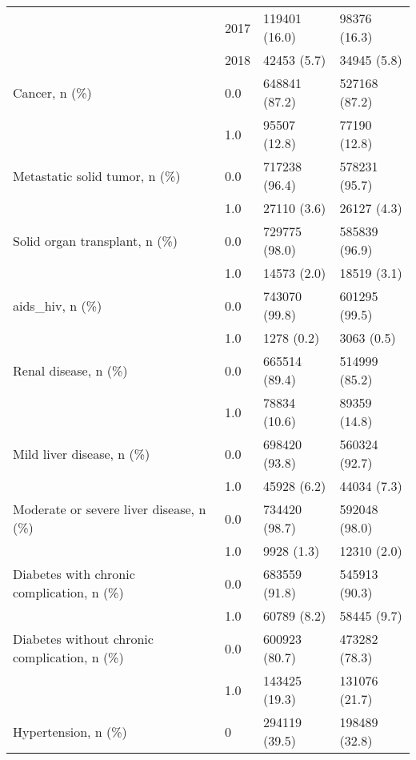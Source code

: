 \begin{tabular}{llll}
                                       & 2017 &      119401 (16.0) &       98376 (16.3) \\
                                       & 2018 &        42453 (5.7) &        34945 (5.8) \\
Cancer, n (\%) & 0.0 &      648841 (87.2) &      527168 (87.2) \\
                                       & 1.0 &       95507 (12.8) &       77190 (12.8) \\
Metastatic solid tumor, n (\%) & 0.0 &      717238 (96.4) &      578231 (95.7) \\
                                       & 1.0 &        27110 (3.6) &        26127 (4.3) \\
Solid organ transplant, n (\%) & 0.0 &      729775 (98.0) &      585839 (96.9) \\
                                       & 1.0 &        14573 (2.0) &        18519 (3.1) \\
aids\_hiv, n (\%) & 0.0 &      743070 (99.8) &      601295 (99.5) \\
                                       & 1.0 &         1278 (0.2) &         3063 (0.5) \\
Renal disease, n (\%) & 0.0 &      665514 (89.4) &      514999 (85.2) \\
                                       & 1.0 &       78834 (10.6) &       89359 (14.8) \\
Mild liver disease, n (\%) & 0.0 &      698420 (93.8) &      560324 (92.7) \\
                                       & 1.0 &        45928 (6.2) &        44034 (7.3) \\
Moderate or severe liver disease, n (\%) & 0.0 &      734420 (98.7) &      592048 (98.0) \\
                                       & 1.0 &         9928 (1.3) &        12310 (2.0) \\
Diabetes with chronic complication, n (\%) & 0.0 &      683559 (91.8) &      545913 (90.3) \\
                                       & 1.0 &        60789 (8.2) &        58445 (9.7) \\
Diabetes without chronic complication, n (\%) & 0.0 &      600923 (80.7) &      473282 (78.3) \\
                                       & 1.0 &      143425 (19.3) &      131076 (21.7) \\
Hypertension, n (\%) & 0 &      294119 (39.5) &      198489 (32.8) \\

\end{tabular}
